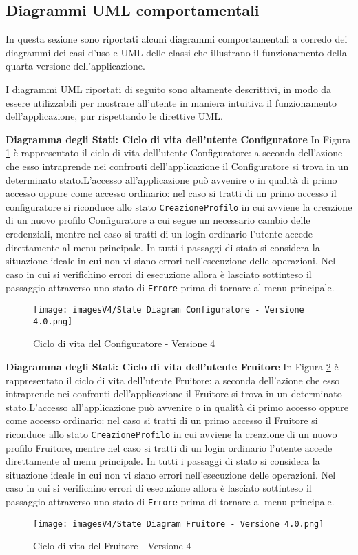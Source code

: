 \newpage
\subsection{Diagrammi UML comportamentali}
In questa sezione sono riportati alcuni diagrammi comportamentali a corredo dei diagrammi dei casi d'uso e UML delle classi che illustrano il funzionamento della quarta versione dell'applicazione.

I diagrammi UML riportati di seguito sono altamente descrittivi, in modo da essere utilizzabili per mostrare all'utente in maniera intuitiva il funzionamento dell'applicazione, pur rispettando le direttive UML.\bigskip

\textbf{Diagramma degli Stati: Ciclo di vita dell'utente Configuratore}\newline
In Figura \ref{fig:State diagram 4.1} è rappresentato il ciclo di vita dell'utente Configuratore: a seconda dell'azione che esso intraprende nei confronti dell'applicazione il Configuratore si trova in un determinato stato.\newline L'accesso all'applicazione può avvenire o in qualità di primo accesso oppure come accesso ordinario: nel caso si tratti di un primo accesso il configuratore si riconduce allo stato \texttt{CreazioneProfilo} in cui avviene la creazione di un nuovo profilo Configuratore a cui segue un necessario cambio delle credenziali, mentre nel caso si tratti di un login ordinario l'utente accede direttamente al menu principale. \newline 
In tutti i passaggi di stato si considera la situazione ideale in cui non vi siano errori nell'esecuzione delle operazioni. Nel caso in cui si verifichino errori di esecuzione allora è lasciato sottinteso il passaggio attraverso uno stato di \texttt{Errore} prima di tornare al menu principale.

\begin{figure}[ht]
\centering
\texttt{[image: imagesV4/State Diagram Configuratore - Versione 4.0.png]}
\caption{\label{fig:State diagram 4.1}Ciclo di vita del Configuratore - Versione 4}
\end{figure}\bigskip

\textbf{Diagramma degli Stati: Ciclo di vita dell'utente Fruitore}\newline
In Figura \ref{fig:State diagram 4.2} è rappresentato il ciclo di vita dell'utente Fruitore: a seconda dell'azione che esso intraprende nei confronti dell'applicazione il Fruitore si trova in un determinato stato.\newline L'accesso all'applicazione può avvenire o in qualità di primo accesso oppure come accesso ordinario: nel caso si tratti di un primo accesso il Fruitore si riconduce allo stato \texttt{CreazioneProfilo} in cui avviene la creazione di un nuovo profilo Fruitore, mentre nel caso si tratti di un login ordinario l'utente accede direttamente al menu principale. \newline 
In tutti i passaggi di stato si considera la situazione ideale in cui non vi siano errori nell'esecuzione delle operazioni. Nel caso in cui si verifichino errori di esecuzione allora è lasciato sottinteso il passaggio attraverso uno stato di \texttt{Errore} prima di tornare al menu principale.

\begin{figure}[t!]
\centering
\texttt{[image: imagesV4/State Diagram Fruitore - Versione 4.0.png]}
\caption{\label{fig:State diagram 4.2}Ciclo di vita del Fruitore - Versione 4}
\end{figure}\bigskip